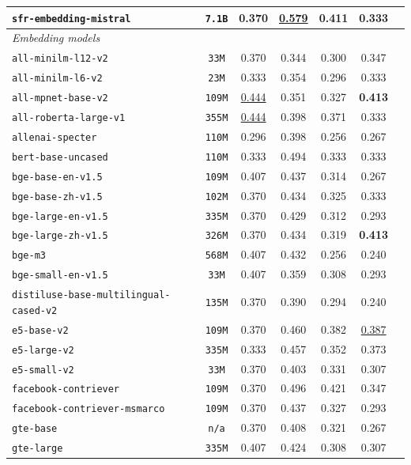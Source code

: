 \documentclass{article}
\begin{document}
\begin{table}[htbp]
{\begin{tabular}{lcccccc}
\texttt{sfr-embedding-mistral} & \texttt{7.1B} & \textbf{0.370} & \underline{0.579} & 0.411 & \textbf{0.333} \\
\midrule
\multicolumn{6}{l}{\textit{Embedding models}} \\
\midrule
\texttt{all-minilm-l12-v2} & \texttt{33M} & 0.370 & 0.344 & 0.300 & 0.347 \\
\texttt{all-minilm-l6-v2} & \texttt{23M} & 0.333 & 0.354 & 0.296 & 0.333 \\
\texttt{all-mpnet-base-v2} & \texttt{109M} & \underline{0.444} & 0.351 & 0.327 & \textbf{0.413} \\
\texttt{all-roberta-large-v1} & \texttt{355M} & \underline{0.444} & 0.398 & 0.371 & 0.333 \\
\texttt{allenai-specter} & \texttt{110M} & 0.296 & 0.398 & 0.256 & 0.267 \\
\texttt{bert-base-uncased} & \texttt{110M} & 0.333 & 0.494 & 0.333 & 0.333 \\
\texttt{bge-base-en-v1.5} & \texttt{109M} & 0.407 & 0.437 & 0.314 & 0.267 \\
\texttt{bge-base-zh-v1.5} & \texttt{102M} & 0.370 & 0.434 & 0.325 & 0.333 \\
\texttt{bge-large-en-v1.5} & \texttt{335M} & 0.370 & 0.429 & 0.312 & 0.293 \\
\texttt{bge-large-zh-v1.5} & \texttt{326M} & 0.370 & 0.434 & 0.319 & \textbf{0.413} \\
\texttt{bge-m3} & \texttt{568M} & 0.407 & 0.432 & 0.256 & 0.240 \\
\texttt{bge-small-en-v1.5} & \texttt{33M} & 0.407 & 0.359 & 0.308 & 0.293 \\
\texttt{distiluse-base-multilingual-cased-v2} & \texttt{135M} & 0.370 & 0.390 & 0.294 & 0.240 \\
\texttt{e5-base-v2} & \texttt{109M} & 0.370 & 0.460 & 0.382 & \underline{0.387} \\
\texttt{e5-large-v2} & \texttt{335M} & 0.333 & 0.457 & 0.352 & 0.373 \\
\texttt{e5-small-v2} & \texttt{33M} & 0.370 & 0.403 & 0.331 & 0.307 \\
\texttt{facebook-contriever} & \texttt{109M} & 0.370 & 0.496 & 0.421 & 0.347 \\
\texttt{facebook-contriever-msmarco} & \texttt{109M} & 0.370 & 0.437 & 0.327 & 0.293 \\
\texttt{gte-base} & \texttt{n/a} & 0.370 & 0.408 & 0.321 & 0.267 \\
\texttt{gte-large} & \texttt{335M} & 0.407 & 0.424 & 0.308 & 0.307 \\

\end{tabular}}
\end{table}
\end{document}
